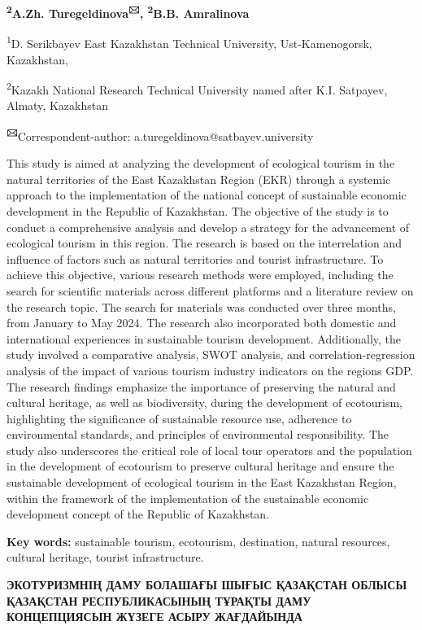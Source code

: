 {\bfseries \textsuperscript{2}A.Zh. Turegeldinova\textsuperscript{🖂},
\textsuperscript{2}B.B. Amralinova}

\textsuperscript{1}D. Serikbayev East Kazakhstan Technical University,
Ust-Kamenogorsk, Kazakhstan,

\textsuperscript{2}Kazakh National Research Technical University named
after K.I. Satpayev, Almaty, Kazakhstan

{\bfseries \textsuperscript{🖂}}Correspondent-author:
a.turegeldinova@satbayev.university

This study is aimed at analyzing the development of ecological tourism
in the natural territories of the East Kazakhstan Region (EKR) through a
systemic approach to the implementation of the national concept of
sustainable economic development in the Republic of Kazakhstan. The
objective of the study is to conduct a comprehensive analysis and
develop a strategy for the advancement of ecological tourism in this
region. The research is based on the interrelation and influence of
factors such as natural territories and tourist infrastructure. To
achieve this objective, various research methods were employed,
including the search for scientific materials across different platforms
and a literature review on the research topic. The search for materials
was conducted over three months, from January to May 2024. The research
also incorporated both domestic and international experiences in
sustainable tourism development. Additionally, the study involved a
comparative analysis, SWOT analysis, and correlation-regression analysis
of the impact of various tourism industry indicators on the
region\textquotesingle s GDP. The research findings emphasize the
importance of preserving the natural and cultural heritage, as well as
biodiversity, during the development of ecotourism, highlighting the
significance of sustainable resource use, adherence to environmental
standards, and principles of environmental responsibility. The study
also underscores the critical role of local tour operators and the
population in the development of ecotourism to preserve cultural
heritage and ensure the sustainable development of ecological tourism in
the East Kazakhstan Region, within the framework of the implementation
of the sustainable economic development concept of the Republic of
Kazakhstan.

{\bfseries Key words:} sustainable tourism, ecotourism, destination,
natural resources, cultural heritage, tourist infrastructure.

{\bfseries ЭКОТУРИЗМНІҢ ДАМУ БОЛАШАҒЫ ШЫҒЫС ҚАЗАҚСТАН ОБЛЫСЫ ҚАЗАҚСТАН
РЕСПУБЛИКАСЫНЫҢ ТҰРАҚТЫ ДАМУ КОНЦЕПЦИЯСЫН ЖҮЗЕГЕ АСЫРУ ЖАҒДАЙЫНДА}


